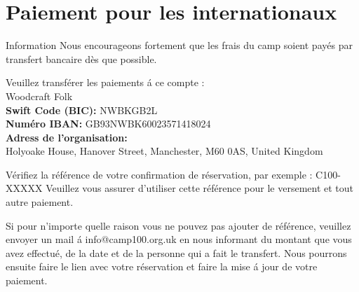 \documentclass[a4paper, 11pt]{report}
\begin{document}
\chapter{Paiement pour les internationaux }

\begin{callout-green}{Information}
Nous encourageons fortement que les frais du camp soient pay\'es par transfert bancaire d\`es que possible.
\end{callout-green}

Veuillez transf\'erer les paiements \'a ce compte :\\
Woodcraft Folk\\
\textbf{Swift Code (BIC):} NWBKGB2L\\
\textbf{Num\'ero IBAN:} GB93NWBK60023571418024\\
\textbf{Adress de l'organisation:} \\
Holyoake House, Hanover Street, Manchester, M60 0AS, United Kingdom

V\'erifiez la r\'ef\'erence de votre confirmation de r\'eservation, par exemple : C100-XXXXX Veuillez vous assurer d'utiliser cette r\'ef\'erence pour le versement et tout autre paiement.

Si pour n'importe quelle raison vous ne pouvez pas ajouter de r\'ef\'erence, veuillez envoyer un mail \'a info@camp100.org.uk en nous informant du montant que vous avez effectu\'e, de la date et de la personne qui a fait le transfert. Nous pourrons ensuite faire le lien avec votre r\'eservation et faire la mise \'a jour de votre paiement.

\makedocumentbackpage
\end{document}

